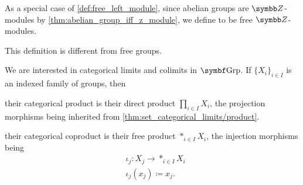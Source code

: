 \begin{definition}\label{def:free_abelian_group}
  As a special case of \cref{def:free_left_module}, since abelian groups are \( \Z \)-modules by \cref{thm:abelian_group_iff_z_module}, we define  to be free \( \Z \)-modules.

  This definition is different from free groups.
\end{definition}

\begin{proposition}\label{thm:group_categorical_limits}
  We are interested in categorical limits and colimits in \( \Cat{Grp} \). If \( \{ X_i \}_{i \in I} \) is an indexed family of groups, then
  \begin{defenum}
     their categorical product is their direct product \( \prod_{i \in I} X_i \), the projection morphisms being inherited from \cref{thm:set_categorical_limits/product}.

     their categorical coproduct is their free product \( \ast_{i \in I} X_i \), the injection morphisms being
    \begin{align*}
      &\iota_j: X_j \to \ast_{i \in I} X_i \\
      &\iota_j(x_j) \coloneqq x_j.
    \end{align*}
  \end{defenum}
\end{proposition}

